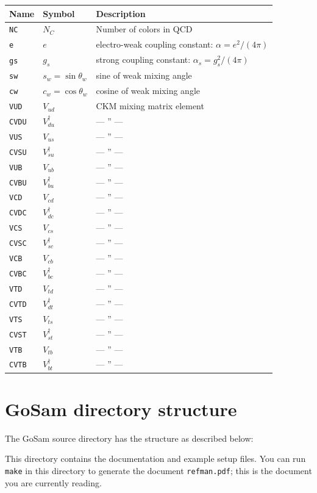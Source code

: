 \documentclass[11pt,a4paper]{refrep}
\newcommand{\gosamversion}{{2{.}0}}
\newcommand{\gosam}{{\sc GoSam}\xspace}
\newcommand{\gosamv}[1][\gosamversion]{{\sc GoSam}\xspace}
\begin{document}
\medskip
\begin{tabular}{|l|l|l|}
\hline
Name & Symbol & Description\\
\hline
\tt NC & $N_C$ & Number of colors in QCD\\
\tt e & $e$ & electro-weak coupling constant: $\alpha=e^2/(4\pi)$\\
\tt gs & $g_s$ & strong coupling constant: $\alpha_s=g_s^2/(4\pi)$\\
\tt sw & $s_w=\sin\theta_w$ & sine of weak mixing angle\\
\tt cw & $c_w=\cos\theta_w$ & cosine of weak mixing angle\\
\tt VUD & $V_{ud}$ & CKM mixing matrix element\\
\tt CVDU & $V_{du}^{\dagger}$ & --- '' ---\\
\tt VUS & $V_{us}$ & --- '' ---\\
\tt CVSU & $V_{su}^{\dagger}$ & --- '' ---\\
\tt VUB & $V_{ub}$ & --- '' ---\\
\tt CVBU & $V_{bu}^{\dagger}$ & --- '' ---\\
\tt VCD & $V_{cd}$ & --- '' ---\\
\tt CVDC & $V_{dc}^{\dagger}$ & --- '' ---\\
\tt VCS & $V_{cs}$ & --- '' ---\\
\tt CVSC & $V_{sc}^{\dagger}$ & --- '' ---\\
\tt VCB & $V_{cb}$ & --- '' ---\\
\tt CVBC & $V_{bc}^{\dagger}$ & --- '' ---\\
\tt VTD & $V_{td}$ & --- '' ---\\
\tt CVTD & $V_{dt}^{\dagger}$ & --- '' ---\\
\tt VTS & $V_{ts}$ & --- '' ---\\
\tt CVST & $V_{st}^{\dagger}$ & --- '' ---\\
\tt VTB & $V_{tb}$ & --- '' ---\\
\tt CVTB & $V_{bt}^{\dagger}$ & --- '' ---\\
\hline
\end{tabular}

\section{\gosam{} directory structure}
The \gosamv{} source directory has the structure as described below:

 This directory contains the documentation
and example setup files. You can run \texttt{make} in this directory
to generate the document \texttt{refman.pdf}; this is the document you
are currently reading.
\end{document}
